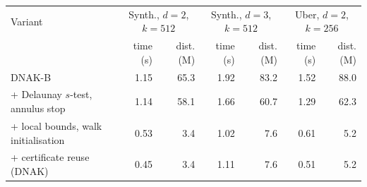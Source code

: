 \begin{tabular}{lrrrrrr}
\toprule
Variant & \multicolumn{2}{c}{Synth., $d{=}2$, $k{=}512$} & \multicolumn{2}{c}{Synth., $d{=}3$, $k{=}512$} & \multicolumn{2}{c}{Uber, $d{=}2$, $k{=}256$} \\
 & time (s) & dist. (M) & time (s) & dist. (M) & time (s) & dist. (M) \\
\midrule
DNAK-B & 1.15 & 65.3 & 1.92 & 83.2 & 1.52 & 88.0 \\
+ Delaunay $s$-test, annulus stop & 1.14 & 58.1 & 1.66 & 60.7 & 1.29 & 62.3 \\
+ local bounds, walk initialisation & 0.53 & 3.4 & 1.02 & 7.6 & 0.61 & 5.2 \\
+ certificate reuse (DNAK) & 0.45 & 3.4 & 1.11 & 7.6 & 0.51 & 5.2 \\
\bottomrule
\end{tabular}
